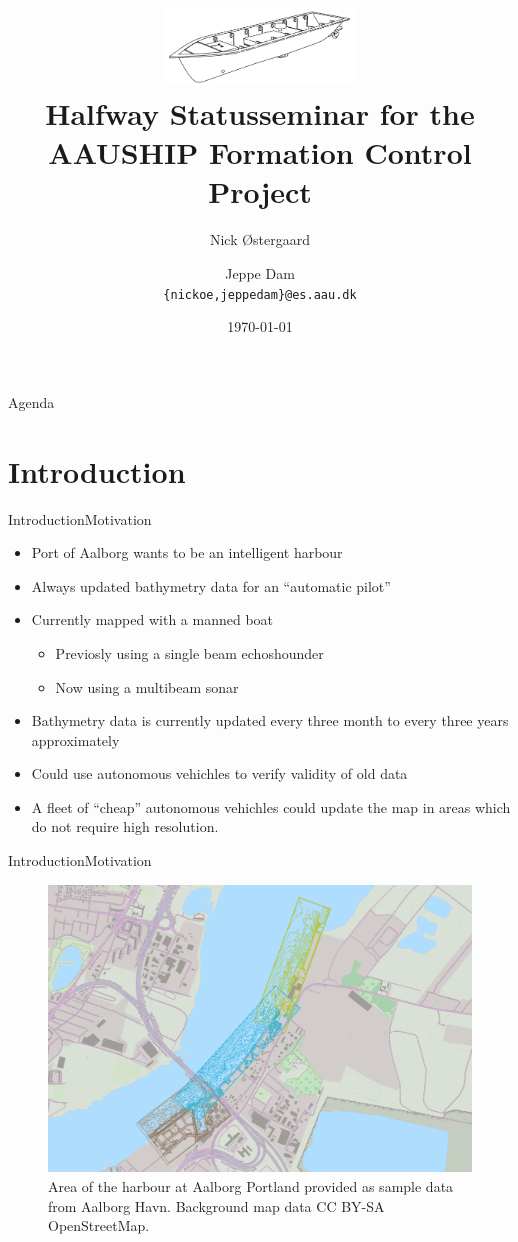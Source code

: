 \documentclass[10pt,handout]{beamer}
\title[AAUSHIP\\ Formation Control]%
{\includegraphics[width=5cm]{../thesis/frontmatter/aauship}\\ Halfway Statusseminar for the\\ AAUSHIP Formation Control Project}
\author[14gr1034]{%
  Nick Østergaard \and Jeppe Dam\\
  {{\tt \{nickoe,jeppedam\}@es.aau.dk}}
}
\institute[
  Dept.\ of Electronic Systems,\\
  Aalborg University,\\
  Denmark
] %
{%
  Department of Electronic Systems,\\
  Aalborg University,\\
  Denmark
  
}
\date{\today}
\begin{document}
\begin{frame}[plain] %
  \titlepage
\end{frame}

\begin{frame}{Agenda}{}
\tableofcontents
\end{frame}
\section{Introduction}
\begin{frame}{Introduction}{Motivation}
  \begin{itemize}
    \item Port of Aalborg wants to be an intelligent harbour
    \item Always updated bathymetry data for an ``automatic pilot''
    \item Currently mapped with a manned boat
    \begin{itemize}
      \item Previosly using a single beam echoshounder
      \item Now using a multibeam sonar
    \end{itemize}
    \item Bathymetry data is currently updated every three month to every three years approximately
    \item Could use autonomous vehichles to verify validity of old data
    \item A fleet of ``cheap'' autonomous vehichles could update the map in areas which do not require high resolution.
  \end{itemize}
\end{frame}

\begin{frame}{Introduction}{Motivation}
  \begin{figure}
	  \includegraphics[width=\textwidth]{../thesis/fig/use-case-data}
	  \caption{\scriptsize Area of the harbour at Aalborg Portland provided as sample
	  data from Aalborg Havn. Background map data CC BY-SA OpenStreetMap.}
  \end{figure}
\end{frame}
\end{document}
